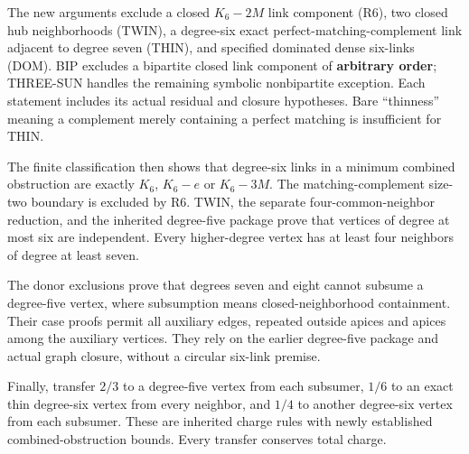 \documentclass[11pt,a4paper]{article}
\begin{document}
The new arguments exclude a closed \(K_6-2M\) link component (R6), two closed hub neighborhoods (TWIN), a degree-six exact perfect-matching-complement link adjacent to degree seven (THIN), and specified dominated dense six-links (DOM). BIP excludes a bipartite closed link component of \textbf{arbitrary order}; THREE-SUN handles the remaining symbolic nonbipartite exception. Each statement includes its actual residual and closure hypotheses. Bare ``thinness'' meaning a complement merely containing a perfect matching is insufficient for THIN.

The finite classification then shows that degree-six links in a minimum combined obstruction are exactly \(K_6\), \(K_6-e\) or \(K_6-3M\). The matching-complement size-two boundary is excluded by R6. TWIN, the separate four-common-neighbor reduction, and the inherited degree-five package prove that vertices of degree at most six are independent. Every higher-degree vertex has at least four neighbors of degree at least seven.

The donor exclusions prove that degrees seven and eight cannot subsume a degree-five vertex, where subsumption means closed-neighborhood containment. Their case proofs permit all auxiliary edges, repeated outside apices and apices among the auxiliary vertices. They rely on the earlier degree-five package and actual graph closure, without a circular six-link premise.

Finally, transfer \(2/3\) to a degree-five vertex from each subsumer, \(1/6\) to an exact thin degree-six vertex from every neighbor, and \(1/4\) to another degree-six vertex from each subsumer. These are inherited charge rules with newly established combined-obstruction bounds. Every transfer conserves total charge.
\end{document}
